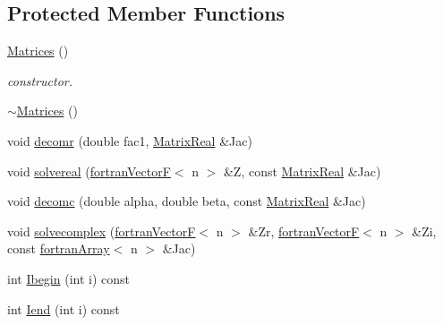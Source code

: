 \subsection*{Protected Member Functions}
\begin{DoxyCompactItemize}
\item 
\hyperlink{classodes_1_1Matrices_3_01true_00_01true_00_01n_00_01nsub_00_01nsup_01_4_a27dbc5fade1db5c5d9b1ccca51a0ead0}{Matrices} ()
\begin{DoxyCompactList}\small\item\em constructor. \end{DoxyCompactList}\item 
\hyperlink{classodes_1_1Matrices_3_01true_00_01true_00_01n_00_01nsub_00_01nsup_01_4_a5942ae878532fd61f899e97b4261c43f}{$\sim$\+Matrices} ()
\item 
void \hyperlink{classodes_1_1Matrices_3_01true_00_01true_00_01n_00_01nsub_00_01nsup_01_4_a8cd0779d5bb48e5d2516dfdf16de6a09}{decomr} (double fac1, \hyperlink{classodes_1_1Matrices_3_01true_00_01true_00_01n_00_01nsub_00_01nsup_01_4_a9c13d85a737f0806d9cfff89d3d59c52}{Matrix\+Real} \&Jac)
\item 
void \hyperlink{classodes_1_1Matrices_3_01true_00_01true_00_01n_00_01nsub_00_01nsup_01_4_a5a895d98e6090e13f17ffb9810f701de}{solvereal} (\hyperlink{classodes_1_1fortranVectorF}{fortran\+Vector\+F}$<$ n $>$ \&Z, const \hyperlink{classodes_1_1Matrices_3_01true_00_01true_00_01n_00_01nsub_00_01nsup_01_4_a9c13d85a737f0806d9cfff89d3d59c52}{Matrix\+Real} \&Jac)
\item 
void \hyperlink{classodes_1_1Matrices_3_01true_00_01true_00_01n_00_01nsub_00_01nsup_01_4_afed6a39b120245ba6edcf4f63f6de12d}{decomc} (double alpha, double beta, const \hyperlink{classodes_1_1Matrices_3_01true_00_01true_00_01n_00_01nsub_00_01nsup_01_4_a9c13d85a737f0806d9cfff89d3d59c52}{Matrix\+Real} \&Jac)
\item 
void \hyperlink{classodes_1_1Matrices_3_01true_00_01true_00_01n_00_01nsub_00_01nsup_01_4_a1e0221f169b52fa3ea0cc8fc9b183000}{solvecomplex} (\hyperlink{classodes_1_1fortranVectorF}{fortran\+Vector\+F}$<$ n $>$ \&Zr, \hyperlink{classodes_1_1fortranVectorF}{fortran\+Vector\+F}$<$ n $>$ \&Zi, const \hyperlink{classodes_1_1fortranArray}{fortran\+Array}$<$ n $>$ \&Jac)
\item 
int \hyperlink{classodes_1_1Matrices_3_01true_00_01true_00_01n_00_01nsub_00_01nsup_01_4_aae6b47d39f156823d04c5f30f59ed7e0}{Ibegin} (int i) const 
\item 
int \hyperlink{classodes_1_1Matrices_3_01true_00_01true_00_01n_00_01nsub_00_01nsup_01_4_a512627e0c148c63137533dda97c866d4}{Iend} (int i) const 
\end{DoxyCompactItemize}
